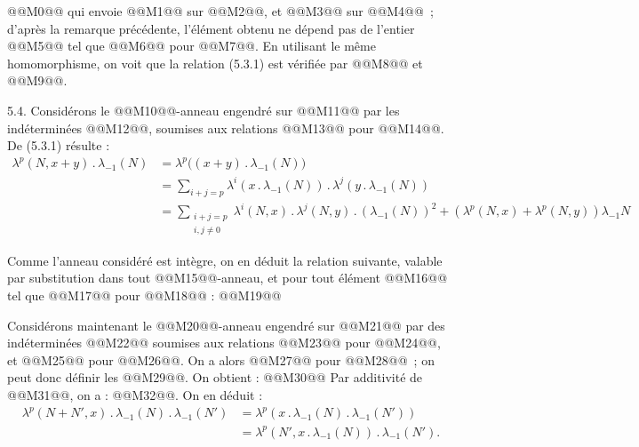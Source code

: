 
@@M0@@ qui
envoie @@M1@@ sur @@M2@@, et @@M3@@ sur @@M4@@~; d'après la remarque précédente, l'élément obtenu ne dépend pas de l'entier @@M5@@ tel que @@M6@@ pour @@M7@@. En utilisant le même homomorphisme, on voit que la relation (5.3.1) est vérifiée par @@M8@@ et @@M9@@.

5.4. Considérons le @@M10@@-anneau engendré sur @@M11@@ par les indéterminées @@M12@@, soumises aux relations @@M13@@ pour @@M14@@. De (5.3.1) résulte :
\begin{align*}
  \lambda^p(N,x+y)\mathbin{.}\lambda_{-1}(N)
  &=\lambda^p\bigl((x+y)\mathbin{.}\lambda_{-1}(N)\bigr)\\
  &=\sum_{i+j=p}\lambda^i(x\mathbin{.}\lambda_{-1}(N))\mathbin{.}\lambda^j(y\mathbin{.}\lambda_{-1}(N))\\
  &=\sum_{\substack{i+j=p\\ i,j\ne0}}\lambda^i(N,x)\mathbin{.}\lambda^j(N,y)\mathbin{.}(\lambda_{-1}(N))^2
    +(\lambda^p(N,x)+\lambda^p(N,y))\lambda_{-1}N
\end{align*}

Comme l'anneau considéré est intègre, on en déduit la relation suivante, valable par substitution dans tout @@M15@@-anneau, et pour tout élément @@M16@@ tel que @@M17@@ pour @@M18@@ :
@@M19@@

Considérons maintenant le @@M20@@-anneau engendré sur @@M21@@ par des indéterminées @@M22@@ soumises aux relations @@M23@@ pour @@M24@@, et @@M25@@ pour @@M26@@. On a alors @@M27@@ pour @@M28@@~; on peut donc définir les @@M29@@. On obtient :
@@M30@@
Par additivité de @@M31@@, on a : @@M32@@. On en déduit :
\begin{align*}
  \lambda^p(N+N',x)\mathbin{.}\lambda_{-1}(N)\mathbin{.}\lambda_{-1}(N')
  &=\lambda^p(x\mathbin{.}\lambda_{-1}(N)\mathbin{.}\lambda_{-1}(N'))\\
  &=\lambda^p(N',x\mathbin{.}\lambda_{-1}(N))\mathbin{.}\lambda_{-1}(N').
\end{align*}

